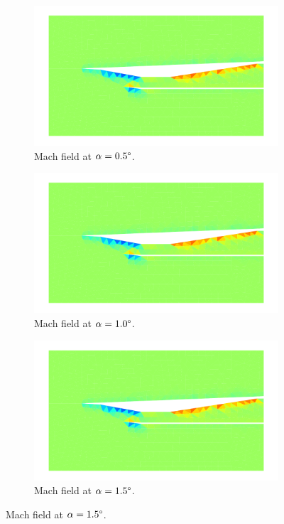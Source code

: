 \begin{figure}[h]
    \centering
    \begin{subfigure}[h]{0.32\linewidth}
        \centering
        \includegraphics[width=\linewidth]{rep/q5/mach_a5.pdf}
        \caption{Mach field at $\alpha=0.5\degree$.}
    \end{subfigure}
    \begin{subfigure}[h]{0.32\linewidth}
        \centering
        \includegraphics[width=\linewidth]{rep/q5/mach_a10.pdf}
        \caption{Mach field at $\alpha=1.0\degree$.}
    \end{subfigure}
    \begin{subfigure}[h]{0.32\linewidth}
        \centering
        \includegraphics[width=\linewidth]{rep/q5/mach_a15.pdf}
        \caption{Mach field at $\alpha=1.5\degree$.}
    \end{subfigure}


\end{figure}
